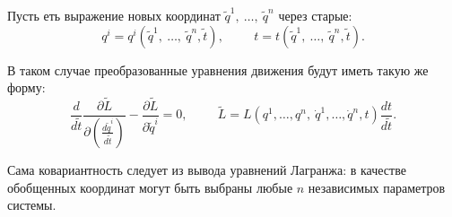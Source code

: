Пусть еть выражение новых координат $\tilde q^1,\ \ldots,\ \tilde q^n $ через старые:
\begin{equation*}
    q^i = q^i (\tilde q^1,\ \ldots,\ \tilde q^n, \tilde t),
    \hspace{1cm}
    t = t(\tilde q^1,\ \ldots,\ \tilde q^n , \tilde t).
\end{equation*}

В таком случае преобразованные уравнения движения будут иметь такую же форму:
\begin{equation*}
    \frac{d }{d \tilde t} \frac{\partial \tilde L}{\partial (\frac{d \tilde q^i}{d \tilde t} )} 
    -
    \frac{\partial \tilde L}{\partial \tilde q^i} = 0,
    \hspace{1cm} 
    \tilde L = L(q^1, \ldots, q^n, \ \dot{q}^1, \ldots, \dot{q}^n, t) \frac{d t}{d \tilde t}.
\end{equation*}

Сама ковариантность следует из вывода уравнений Лагранжа: в качестве обобщенных координат могут быть выбраны любые $n$ независимых параметров системы.